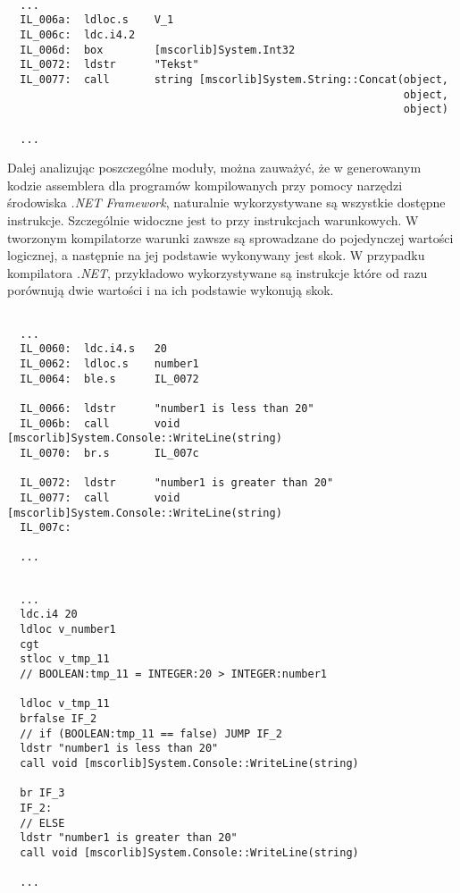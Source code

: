 \begin{lstlisting}[language=IL, caption={Fragment kodu deasemblerowanego testu programu C\#, przedstawiający łączenie łańcuchów znaków}, label=alg:asm]

  ...
  IL_006a:  ldloc.s    V_1
  IL_006c:  ldc.i4.2
  IL_006d:  box        [mscorlib]System.Int32
  IL_0072:  ldstr      "Tekst"
  IL_0077:  call       string [mscorlib]System.String::Concat(object,
                                                              object,
                                                              object)

  ...
\end{lstlisting}

\par Dalej analizując poszczególne moduły, można zauważyć, że w generowanym kodzie assemblera dla programów kompilowanych przy pomocy narzędzi środowiska \textit{.NET Framework}, naturalnie wykorzystywane są wszystkie dostępne instrukcje. Szczególnie widoczne jest to przy instrukcjach warunkowych. W tworzonym kompilatorze warunki zawsze są sprowadzane do pojedynczej wartości logicznej, a następnie na jej podstawie wykonywany jest skok. W przypadku kompilatora \textit{.NET}, przykładowo wykorzystywane są instrukcje które od razu porównują dwie wartości i na ich podstawie wykonują skok.

\begin{lstlisting}[language=IL, caption={Fragment kodu deasemblerowanego testu programu C\#, przedstawiający instrukcje \texttt{if ... else}}, label=alg:asm]

  ...
  IL_0060:  ldc.i4.s   20
  IL_0062:  ldloc.s    number1
  IL_0064:  ble.s      IL_0072

  IL_0066:  ldstr      "number1 is less than 20"
  IL_006b:  call       void [mscorlib]System.Console::WriteLine(string)
  IL_0070:  br.s       IL_007c

  IL_0072:  ldstr      "number1 is greater than 20"
  IL_0077:  call       void [mscorlib]System.Console::WriteLine(string)
  IL_007c:  

  ...
\end{lstlisting}

\begin{lstlisting}[language=IL, caption={Fragment wygenerowanego kodu asemblerowanego z języka JavaScript, przedstawiający instrukcje \texttt{if ... else}}, label=alg:asm]

  ...
  ldc.i4 20
  ldloc v_number1
  cgt
  stloc v_tmp_11
  // BOOLEAN:tmp_11 = INTEGER:20 > INTEGER:number1
  
  ldloc v_tmp_11
  brfalse IF_2
  // if (BOOLEAN:tmp_11 == false) JUMP IF_2
  ldstr "number1 is less than 20"
  call void [mscorlib]System.Console::WriteLine(string)
  
  br IF_3
  IF_2: 
  // ELSE
  ldstr "number1 is greater than 20"
  call void [mscorlib]System.Console::WriteLine(string)

  ...
\end{lstlisting}

